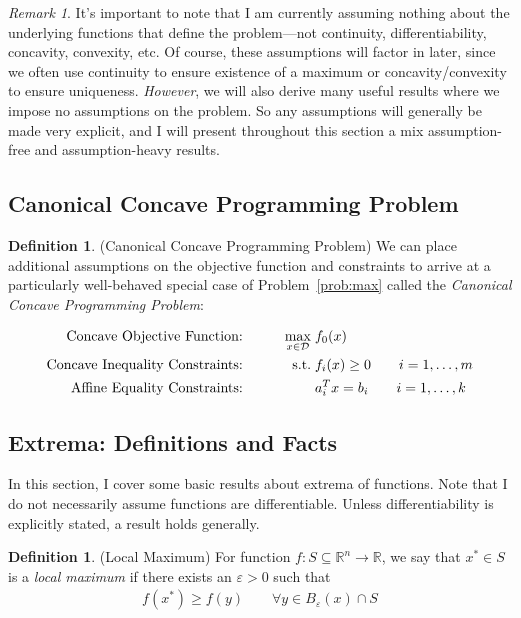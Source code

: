 \documentclass[12pt]{article}
\numberwithin{equation}{section} %
\theoremstyle{plain}
\theoremstyle{definition}
\newtheorem{defn}[thm]{Definition}
\theoremstyle{remark}
\newtheorem*{rmk}{Remark}
\newcommand{\R}{\mathbb{R}}
\newcommand{\Rn}{\mathbb{R}^n}
\begin{document}
\begin{rmk}
It's important to note that I am currently assuming nothing about
the underlying functions that define the problem---not continuity,
differentiability, concavity, convexity, etc. Of course, these assumptions will factor in later, since we often use continuity to
ensure existence of a maximum or concavity/convexity to ensure
uniqueness. \emph{However}, we will also derive many useful results
where we impose no assumptions on the problem. So any assumptions will
generally be made very explicit, and I will present throughout this
section a mix assumption-free and assumption-heavy results.
\end{rmk}

\subsection{Canonical Concave Programming Problem}


\begin{defn}(Canonical Concave Programming Problem)
We can place additional assumptions on the objective function and
constraints to arrive at a particularly well-behaved special case of
Problem~\ref{prob:max} called the
\emph{Canonical Concave Programming Problem}:
\end{defn}
\begin{alignat}{3}
  \text{Concave Objective Function:} \qquad
    && \max_{x\in\mathcal{D}} \; &f_0(x) \label{prob:maxconcave}\\
  \text{Concave Inequality Constraints:} \qquad
    && \text{s.t.} \; &f_i(x) \geq 0 \qquad i = 1,\ldots, m\notag \\
  \text{Affine Equality Constraints:} \qquad
    && &a_i^T x = b_i \qquad i = 1,\ldots,k\notag
\end{alignat}

\subsection{Extrema: Definitions and Facts}
\label{sec:extrema}

In this section, I cover some basic results about extrema of functions.
Note that I do not necessarily assume functions are differentiable.
Unless differentiability is explicitly stated, a result holds generally.

\begin{defn}{(Local Maximum)}
For function $f:S\subseteq\Rn\rightarrow \R$, we say that $x^* \in
S$ is a \emph{local maximum} if there exists an $\varepsilon>0$ such
that
\begin{align*}
  f(x^*)\geq f(y)
  \qquad \forall y \in B_\varepsilon(x) \cap S
\end{align*}
\end{defn}
\end{document}
